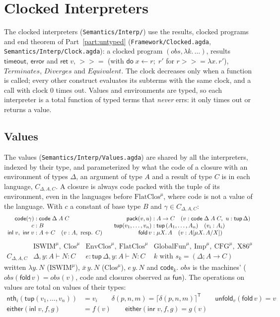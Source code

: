 \documentclass[10pt]{article}
\theoremstyle{acmplain}
\newcommand{\key}[1]{\mathsf{#1}}
\newcommand{\lam}[1]{\lambda #1.\,}
\newcommand{\error}{\key{error}}
\newcommand{\obs}{\mathit{obs}}
\newcommand{\Term}{\mathit{Terminates}}
\newcommand{\Div}{\mathit{Diverges}}
\newcommand{\Equiv}{\mathit{Equivalent}}
\newcommand{\tupV}[1]{\key{tup}(#1)}
\newcommand{\codeV}[1]{\key{code}_{#1}}
\newcommand{\inlV}{\key{inl}\;}
\newcommand{\inrV}{\key{inr}\;}
\newcommand{\tmo}{\key{timeout}}
\newcommand{\Ret}{\key{ret}\;}
\newcommand{\bind}{\mathbin{>\!\!>\!\!=}}
\newcommand{\Do}{\key{do}\;}
\newcommand{\Tpack}[2]{\key{pack}(#1, #2)}     %
\newcommand{\TcodeV}[1]{\key{code}(#1)}                   %
\newcommand{\Tres}[1]{\lceil #1 \rceil^{\mathsf{T}}}      %
\newcommand{\Ml}[1]{\textrm{#1}^{\mu}}                  %
\newcommand{\Mmu}[2]{\mu #1.\,#2}                         %
\newcommand{\Mtup}[1]{\key{tup}\,#1}                      %
\newcommand{\Mcodety}[3]{\key{code}\;#1\;#2\;#3}          %
\newcommand{\Munroll}[2]{#2[\mu #1.\,#2/#1]}              %
\newcommand{\Mfold}{\key{fold}\,}
\begin{document}
\section{Clocked Interpreters}\label{sec:m-interp}

The clocked interpreters (\texttt{Semantics/Interp/}) use the results,
clocked programs and end theorem of Part~\ref{part:untyped}
(\texttt{Framework/Clocked.agda}, \texttt{Semantics/Interp/Clock.agda}): a
clocked program $(\obs, \lambda k.\, \ldots)$, results $\tmo$, $\error$ and
$\Ret v$, $\bind$ (with $\Do x \leftarrow r;\; r'$ for $r \bind \lambda
x.\, r'$), $\Term$, $\Div$ and $\Equiv$. The clock decreases only when a
function is called; every other construct evaluates its subterms with the
same clock, and a call with clock $0$ times out. Values and environments
are typed, so each interpreter is a total function of typed terms that
\emph{never} errs: it only times out or returns a value.

\subsection{Values}\label{sec:m-interp-values}

The values (\texttt{Semantics/Interp/Values.agda}) are shared by all the
interpreters, indexed by their type, and parameterized by what the code of
a closure with an environment of types $\Delta$, an argument of type $A$
and a result of type $C$ is in each language, $C_{\Delta,A,C}$. A closure
is always code packed with the tuple of its environment, even in the
languages before $\Ml{FlatClos}$, where code is not a value of the language.
With $c$ a constant of base type $B$ and $\gamma \in C_{\Delta,A,C}$:
\[
\begin{array}{r@{\;:\;}l@{\qquad}r@{\;:\;}l}
  \TcodeV{\gamma} & \Mcodety{\Delta}{A}{C} &
  \Tpack{v}{u} & A \rightarrow C \quad (v : \Mcodety{\Delta}{A}{C},\ u : \Mtup{\Delta}) \\
  c & B &
  \tupV{v_1, \ldots, v_n} & \Mtup{(A_1, \ldots, A_n)} \quad (v_i : A_i) \\
  \inlV v,\ \inrV v & A + C \quad (v : A, \text{ resp. } C) &
  \Mfold v & \Mmu{X}{A} \quad (v : \Munroll{X}{A})
\end{array}
\]
\[
\begin{array}{l|ccc}
  & \Ml{ISWIM},\ \Ml{Clos} & \Ml{EnvClos},\ \Ml{FlatClos} & \Ml{GlobalFun},\ \Ml{Imp},\ \Ml{CFG},\ \Ml{X86} \\ \hline
  C_{\Delta,A,C} & \Delta, y{:}A \vdash N : C & e{:}\Mtup{\Delta}, y{:}A \vdash N : C &
    k \text{ with } s_k = (\Delta; A \to C)
\end{array}
\]
written $\lam{y} N$ ($\Ml{ISWIM}$), $\bar{x}\, y.\, N$ ($\Ml{Clos}$), $e\,
y.\, N$ and $\codeV{k}$. $\obs$ is the machines' ($\obs(\Mfold v) =
\obs(v)$, code and closures observed as $\key{fun}$). The operations on
values are total on values of their types:
\begin{align*}
  \key{nth}_i(\tupV{v_1, \ldots, v_n}) &= v_i \qquad
  \delta(p, n, m) = \Tres{\delta(p, n, m)} \qquad
  \key{unfold}_v(\Mfold v) = v \\
  \key{either}(\inlV v, f, g) &= f(v) \qquad \key{either}(\inrV v, f, g) = g(v)
\end{align*}
\end{document}
